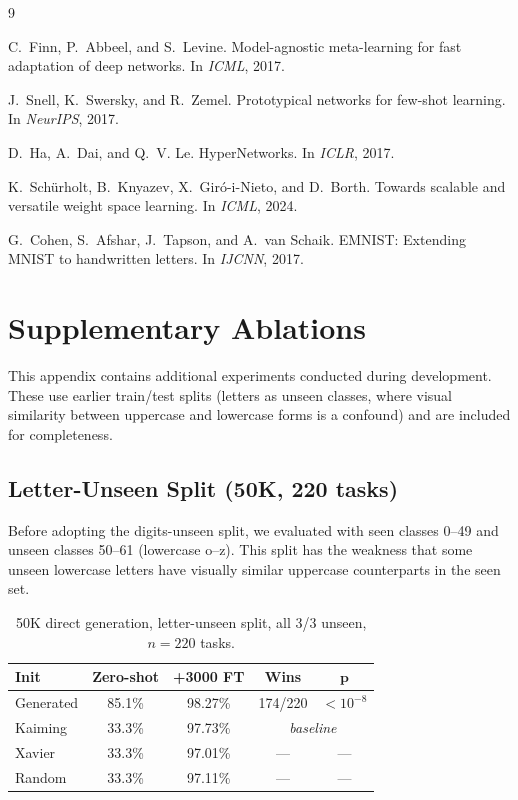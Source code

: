 \documentclass[11pt,a4paper]{article}
\begin{document}

\begin{thebibliography}{9}

C.~Finn, P.~Abbeel, and S.~Levine.
\newblock Model-agnostic meta-learning for fast adaptation of deep networks.
\newblock In \emph{ICML}, 2017.

J.~Snell, K.~Swersky, and R.~Zemel.
\newblock Prototypical networks for few-shot learning.
\newblock In \emph{NeurIPS}, 2017.

D.~Ha, A.~Dai, and Q.~V. Le.
\newblock HyperNetworks.
\newblock In \emph{ICLR}, 2017.

K.~Sch\"{u}rholt, B.~Knyazev, X.~Gir\'{o}-i-Nieto, and D.~Borth.
\newblock Towards scalable and versatile weight space learning.
\newblock In \emph{ICML}, 2024.

G.~Cohen, S.~Afshar, J.~Tapson, and A.~van Schaik.
\newblock EMNIST: Extending MNIST to handwritten letters.
\newblock In \emph{IJCNN}, 2017.

\end{thebibliography}

\appendix
\section{Supplementary Ablations}
\label{app:ablations}

This appendix contains additional experiments conducted during development. These use earlier train/test splits (letters as unseen classes, where visual similarity between uppercase and lowercase forms is a confound) and are included for completeness.

\subsection{Letter-Unseen Split (50K, 220 tasks)}

Before adopting the digits-unseen split, we evaluated with seen classes 0--49 and unseen classes 50--61 (lowercase o--z). This split has the weakness that some unseen lowercase letters have visually similar uppercase counterparts in the seen set.

\begin{table}[H]
\centering
\caption{50K direct generation, letter-unseen split, all 3/3 unseen, $n = 220$ tasks.}
\begin{tabular}{lcccc}
\toprule
\textbf{Init} & \textbf{Zero-shot} & \textbf{+3000 FT} & \textbf{Wins} & $\boldsymbol{p}$ \\
\midrule
Generated & 85.1\% & 98.27\% & 174/220 & $<10^{-8}$ \\
Kaiming & 33.3\% & 97.73\% & \multicolumn{2}{c}{\textit{baseline}} \\
Xavier & 33.3\% & 97.01\% & --- & --- \\
Random & 33.3\% & 97.11\% & --- & --- \\
\bottomrule
\end{tabular}
\end{table}
\end{document}

